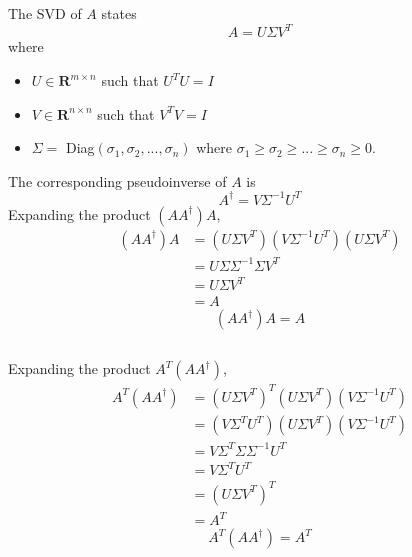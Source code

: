 \documentclass[11pt]{article} %
\begin{document}
\subsection{} %
The SVD of $A$ states
\begin{equation}
A = U \Sigma V^T
\end{equation}
where
\begin{itemize}
\item $U \in \mathbf{R}^{m\times n}$ such that $U^T U = I$
\item $V \in \mathbf{R}^{n\times n}$ such that $V^T V = I$
\item $\Sigma =$ Diag$(\sigma_1, \sigma_2, ... , \sigma_n)$ where $\sigma_1 \ge \sigma_2 \ge ... \ge \sigma_n \ge 0$. 
\end{itemize}
The corresponding pseudoinverse of $A$ is
\begin{equation}
A^\dagger = V \Sigma^{-1} U^T
\end{equation}
Expanding the product $(A A^\dagger )A $,
\begin{equation}
\begin{split}
(A A^\dagger )A &= (U \Sigma V^T )(V \Sigma^{-1} U^T)( U \Sigma V^T) \\
& = U \Sigma \Sigma^{-1} \Sigma V^T \\
& = U \Sigma V^T \\
& = A
\end{split}
\end{equation}
\begin{equation}
\boxed{(A A^\dagger ) A = A}
\end{equation}

\subsection{} %
Expanding the product $A^T(A A^\dagger )$,
\begin{equation}
\begin{split}
A^T(A A^\dagger ) &= (U \Sigma V^T )^T (U \Sigma V^T ) (V \Sigma^{-1} U^T) \\
&= (V \Sigma^T U^T ) (U \Sigma V^T ) (V \Sigma^{-1} U^T) \\
&= V \Sigma^T \Sigma  \Sigma^{-1} U^T \\
&= V \Sigma^T  U^T \\
&= (U \Sigma  V^T)^T \\
&= A^T 
\end{split}
\end{equation}
\begin{equation}
\boxed{A^T(A A^\dagger ) = A^T}
\end{equation}
\end{document}

